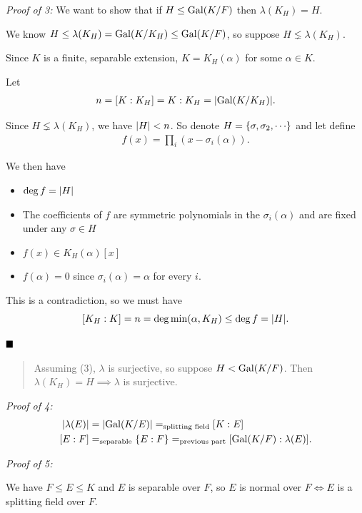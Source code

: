 \emph{Proof of 3:} We want to show that if \(H\leq \mathrm{Gal}(K/F)\) then
\(\lambda(K_H) = H\).

We know \(H \leq \lambda(K_H) = \mathrm{Gal}(K/K_H) \leq \mathrm{Gal}(K/F)\), so suppose
\(H \lneq \lambda(K_H)\).

Since \(K\) is a finite, separable extension, \(K = K_H(\alpha)\) for
some \(\alpha \in K\).

Let \begin{align*}
n = [K: K_H] = {K: K_H} = {\left\lvert {\mathrm{Gal}(K/K_H)} \right\rvert}
.\end{align*}

Since \(H \lneq \lambda(K_H)\), we have \({\left\lvert {H} \right\rvert} < n\). So denote
\(H = \left\{{\sigma, \sigma_2, \cdots}\right\}\) and let define \begin{align*}
f(x) = \prod_i (x - \sigma_i(\alpha))
.\end{align*}

We then have

\begin{itemize}
\item
  \(\deg f = {\left\lvert {H} \right\rvert}\)
\item
  The coefficients of \(f\) are symmetric polynomials in the
  \(\sigma_i(\alpha)\) and are fixed under any \(\sigma\in H\)
\item
  \(f(x) \in K_H(\alpha)[x]\)
\item
  \(f(\alpha) = 0\) since \(\sigma_i(\alpha) = \alpha\) for every \(i\).
\end{itemize}

This is a contradiction, so we must have \[
[K_H: K] = n = \deg \min(\alpha, K_H) \leq \deg f = {\left\lvert {H} \right\rvert}
.\]

\(\qed\)

\begin{quote}
Assuming (3), \(\lambda\) is surjective, so suppose \(H < \mathrm{Gal}(K/F)\).
Then \(\lambda(K_H) = H \implies \lambda\) is surjective.
\end{quote}

\emph{Proof of 4:} \begin{align*}
{\left\lvert {\lambda(E)} \right\rvert} &= {\left\lvert {\mathrm{Gal}(K/E)} \right\rvert} =_{\text{splitting field}} [K: E]  \\
[E: F] &=_{\text{separable}} \{E: F\} =_{\text{previous part}} [\mathrm{Gal}(K/F): \lambda(E)]
.\end{align*}

\emph{Proof of 5:}

We have \(F\leq E \leq K\) and \(E\) is separable over \(F\), so \(E\)
is normal over \(F \iff E\) is a splitting field over \(F\).

